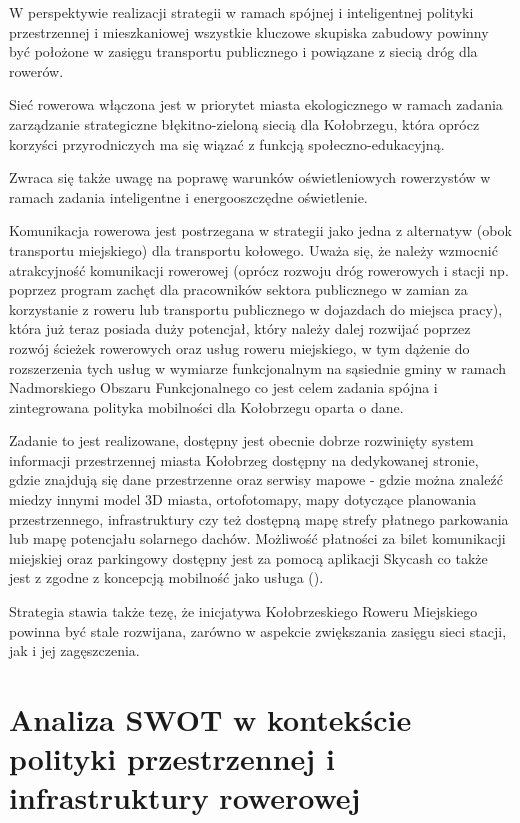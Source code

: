 \documentclass{amuthesis}
\begin{document}
W perspektywie realizacji strategii w ramach spójnej i inteligentnej polityki przestrzennej i mieszkaniowej wszystkie kluczowe skupiska zabudowy powinny być położone w zasięgu transportu publicznego i powiązane z siecią dróg dla rowerów.

Sieć rowerowa włączona jest w priorytet miasta ekologicznego w ramach zadania zarządzanie strategiczne błękitno-zieloną siecią dla Kołobrzegu, która oprócz korzyści przyrodniczych ma się wiązać z funkcją społeczno-edukacyjną.

Zwraca się także uwagę na poprawę warunków oświetleniowych rowerzystów w ramach zadania inteligentne i energooszczędne oświetlenie.

Komunikacja rowerowa jest postrzegana w strategii jako jedna z alternatyw (obok transportu miejskiego) dla transportu kołowego.
Uważa się, że należy wzmocnić atrakcyjność komunikacji rowerowej (oprócz rozwoju dróg rowerowych i stacji np. poprzez program zachęt dla pracowników sektora publicznego w zamian za korzystanie z roweru lub transportu publicznego w dojazdach do miejsca pracy), która już teraz posiada duży potencjał, który należy dalej rozwijać poprzez rozwój ścieżek rowerowych oraz usług roweru miejskiego, w tym dążenie do rozszerzenia tych usług w wymiarze funkcjonalnym na sąsiednie gminy w ramach Nadmorskiego Obszaru Funkcjonalnego co jest celem zadania spójna i zintegrowana polityka mobilności dla Kołobrzegu oparta o dane.

Zadanie to jest realizowane, dostępny jest obecnie dobrze rozwinięty system informacji przestrzennej miasta Kołobrzeg dostępny na dedykowanej stronie, gdzie znajdują się dane przestrzenne oraz serwisy mapowe - gdzie można znaleźć miedzy innymi model 3D miasta, ortofotomapy, mapy dotyczące planowania przestrzennego, infrastruktury czy też dostępną mapę strefy płatnego parkowania lub mapę potencjału solarnego dachów.
Możliwość płatności za bilet komunikacji miejskiej oraz parkingowy dostępny jest za pomocą aplikacji Skycash co także jest z zgodne z koncepcją mobilność jako usługa (\textcite{smartcity}).

Strategia stawia także tezę, że inicjatywa Kołobrzeskiego Roweru Miejskiego powinna być stale rozwijana, zarówno w aspekcie zwiększania zasięgu sieci stacji, jak i jej zagęszczenia.

\hypertarget{analiza-swot-w-kontekux15bcie-polityki-przestrzennej-i-infrastruktury-rowerowej}{%
\section{Analiza SWOT w kontekście polityki przestrzennej i infrastruktury rowerowej}\label{analiza-swot-w-kontekux15bcie-polityki-przestrzennej-i-infrastruktury-rowerowej}}
\end{document}
